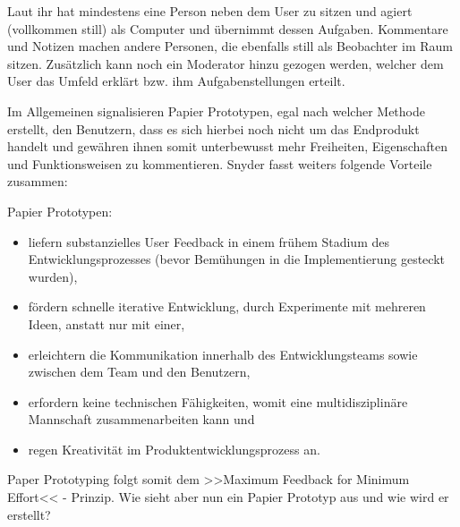 Laut ihr hat mindestens eine Person neben dem User zu sitzen und agiert (vollkommen still) als Computer und übernimmt dessen Aufgaben. Kommentare und Notizen machen andere Personen, die ebenfalls still als Beobachter im Raum sitzen. Zusätzlich kann noch ein Moderator hinzu gezogen werden, welcher dem User das Umfeld erklärt bzw. ihm Aufgabenstellungen erteilt.

\medskip Im Allgemeinen signalisieren Papier Prototypen, egal nach welcher Methode erstellt, den Benutzern, dass es sich hierbei noch nicht um das Endprodukt handelt und gewähren ihnen somit unterbewusst mehr Freiheiten, Eigenschaften und Funktionsweisen zu kommentieren. Snyder fasst weiters folgende Vorteile zusammen:

\medskip Papier Prototypen:
\begin{itemize}
	\item liefern substanzielles User Feedback in einem frühem Stadium des Entwicklungsprozesses (bevor Bemühungen in die Implementierung gesteckt wurden),
	\item fördern schnelle iterative Entwicklung, durch Experimente mit mehreren Ideen, anstatt nur mit einer,
	\item erleichtern die Kommunikation innerhalb des Entwicklungsteams sowie zwischen dem Team und den Benutzern,
	\item erfordern keine technischen Fähigkeiten, womit eine multidisziplinäre Mannschaft zusammenarbeiten kann und
	\item regen Kreativität im Produktentwicklungsprozess an.
\end{itemize}
\begin{flushright}\citep{Snyder:2003}\end{flushright}
	
Paper Prototyping folgt somit dem >>Maximum Feedback for Minimum Effort<< - Prinzip. Wie sieht aber nun ein Papier Prototyp aus und wie wird er erstellt?

